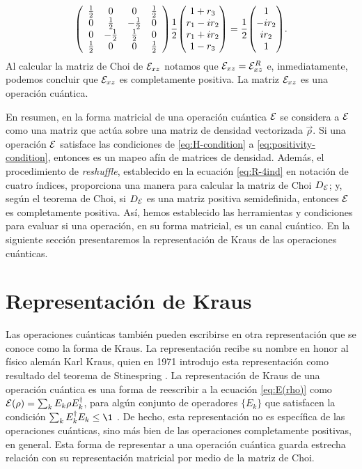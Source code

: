 \begin{align}
\mqty(
\begin{array}{cccc}
\frac{1}{2} & 0 & 0 & \frac{1}{2} \\
0 & \frac{1}{2} & -\frac{1}{2} & 0 \\
0 & -\frac{1}{2} & \frac{1}{2} & 0 \\
\frac{1}{2} & 0 & 0 & \frac{1}{2} \\
\end{array}
)
\frac{1}{2}
\mqty(
1+r_3\\r_1-ir_2\\r_1+ir_2\\1-r_3
)
=
\frac{1}{2}
\mqty(
1\\-ir_2\\ir_2\\1
).
\label{eq:QC-ex2-SR}
\end{align}
Al calcular la matriz de Choi de $\mathcal{E}_{xz}$ notamos 
que $\mathcal{E}_{xz}=\mathcal{E}_{xz}^R$ e, inmediatamente, podemos concluir
que $\mathcal{E}_{xz}$ es completamente positiva. La matriz $\mathcal{E}_{xz}$
es una operación cuántica.

En resumen, en la forma matricial de una operación cuántica $\mathcal{E}$
se considera a $\mathcal{E}$ como una matriz que actúa sobre 
una matriz de densidad vectorizada $\vec{\rho}$. 
Si una operación $\mathcal{E}$ satisface las condiciones de
\eqref{eq:H-condition} a \eqref{eq:positivity-condition}, entonces
es un mapeo afín de matrices de densidad.
Además, el procedimiento de \textit{reshuffle},
establecido en la ecuación \eqref{eq:R-4ind} en notación
de cuatro índices, proporciona una manera para 
calcular la matriz de Choi $D_{\mathcal{E}}$;
y, según el teorema de Choi, si 
$D_{\mathcal{E}}$ es una matriz positiva semidefinida, entonces $\mathcal{E}$ es 
completamente positiva. 
Así, hemos establecido las herramientas y condiciones para evaluar 
si una operación, en su forma matricial, es un canal cuántico.
En la siguiente sección presentaremos la representación de Kraus de las operaciones
cuánticas.
\section{Representación de Kraus} %

Las operaciones cuánticas también pueden escribirse
en otra representación que se conoce como la forma de Kraus.
La representación recibe su nombre en honor al físico alemán Karl Kraus,
quien en 1971 introdujo esta representación como resultado
del teorema de Stinespring \cite{bengtsson_zyczkowski_2017}.
La representación de Kraus de una operación cuántica es una forma
de reescribir a la ecuación \eqref{eq:E(rho)} como
$\mathcal{E}\qty(\rho)=\sum_k E_k\rho E_k^{\dagger}$,
para algún conjunto de operadores $\{E_k\}$ 
que satisfacen la condición $\sum _kE_k^{\dagger}E_k\leq\1$
\cite{nielsen_chuang_2011}. 
De hecho, esta representación no es específica de las operaciones cuánticas, 
sino más bien de las operaciones completamente positivas, 
en general.
 
Esta forma de representar a una
operación cuántica guarda estrecha relación con 
su representación matricial por medio de la matriz de Choi. 


